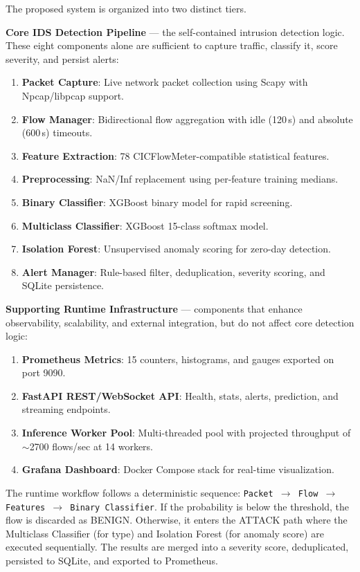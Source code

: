 \documentclass[12pt,a4paper]{article}
\begin{document}
The proposed system is organized into two distinct tiers.

\textbf{Core IDS Detection Pipeline} — the self-contained intrusion detection logic. These eight components alone are sufficient to capture traffic, classify it, score severity, and persist alerts:

\begin{enumerate}
    \item \textbf{Packet Capture}: Live network packet collection using Scapy with Npcap/libpcap support.
    \item \textbf{Flow Manager}: Bidirectional flow aggregation with idle (120\,s) and absolute (600\,s) timeouts.
    \item \textbf{Feature Extraction}: 78 CICFlowMeter-compatible statistical features.
    \item \textbf{Preprocessing}: NaN/Inf replacement using per-feature training medians.
    \item \textbf{Binary Classifier}: XGBoost binary model for rapid screening.
    \item \textbf{Multiclass Classifier}: XGBoost 15-class softmax model.
    \item \textbf{Isolation Forest}: Unsupervised anomaly scoring for zero-day detection.
    \item \textbf{Alert Manager}: Rule-based filter, deduplication, severity scoring, and SQLite persistence.
\end{enumerate}

\textbf{Supporting Runtime Infrastructure} — components that enhance observability, scalability, and external integration, but do not affect core detection logic:

\begin{enumerate}
    \item \textbf{Prometheus Metrics}: 15 counters, histograms, and gauges exported on port 9090.
    \item \textbf{FastAPI REST/WebSocket API}: Health, stats, alerts, prediction, and streaming endpoints.
    \item \textbf{Inference Worker Pool}: Multi-threaded pool with projected throughput of $\sim$2700 flows/sec at 14 workers.
    \item \textbf{Grafana Dashboard}: Docker Compose stack for real-time visualization.
\end{enumerate}

The runtime workflow follows a deterministic sequence: \texttt{Packet $\rightarrow$ Flow $\rightarrow$ Features $\rightarrow$ Binary Classifier}. If the probability is below the threshold, the flow is discarded as BENIGN. Otherwise, it enters the ATTACK path where the Multiclass Classifier (for type) and Isolation Forest (for anomaly score) are executed sequentially. The results are merged into a severity score, deduplicated, persisted to SQLite, and exported to Prometheus.
\end{document}

